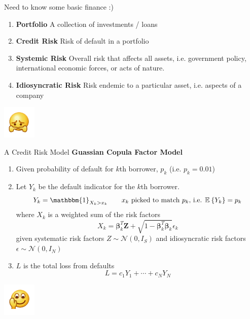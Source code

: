 \documentclass{beamer}
\newcommand{\matr}[1]{\mathbf{#1}}
\newcommand{\E}[2][]{\mathbb{E}_{#1}\left\{#2\right\}}
\newcommand{\normal}[1]{\mathcal{N}\left(#1\right)}
\begin{document}
\begin{frame}{Need to know some basic finance :)}
\begin{enumerate}
    \item \textbf{Portfolio} A collection of investments / loans
    \item \textbf{Credit Risk} Risk of default in a portfolio
    \item \textbf{Systemic Risk} Overall risk that affects all assets, i.e. government policy, international economic forces, or acts of nature.
    \item \textbf{Idiosyncratic Risk} Risk endemic to a particular asset, i.e. aspects of a company
\end{enumerate}
\begin{center}
    \includegraphics{shrunken.png}
\end{center}
\end{frame}



\begin{frame}{A Credit Risk Model}
\textbf{Guassian Copula Factor Model} 
\begin{enumerate}
    \item Given probability of default for $k$th borrower, $p_k$ (i.e. $p_k = 0.01$)
    \item Let $Y_k$ be the default indicator for the $k$th borrower.
    \[
        Y_k = \mathbbm{1}_{X_k > x_k} \qquad \text{$x_k$ picked to match $p_k$, i.e. } \E{Y_k} = p_k
    \]
    where $X_k$ is a weighted sum of the risk factors
    \[
        X_k = \boldsymbol{\beta}_k^T \matr{Z}  + \sqrt{1 - \boldsymbol{\beta}_k^T \boldsymbol{\beta}_k} \epsilon_k
    \]
    given systematic risk factors $Z \sim \normal{0,I_S}$ and idiosyncratic risk factors $\epsilon \sim \normal{0,I_N}$
    \item $L$ is the total loss from defaults
    \[
        L = c_1 Y_1 + \cdots + c_N Y_N    
    \]
\end{enumerate}
\begin{center}
    \includegraphics{wave.png}
\end{center}
\end{frame}
\end{document}
